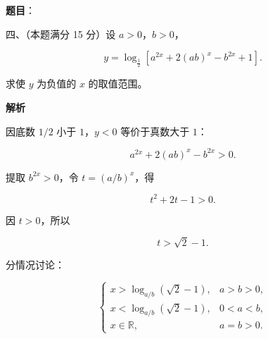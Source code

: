 \begin{answer}

\textbf{题目}：

四、（本题满分 15 分）设 $a>0$，$b>0$，

\nopagebreak[4]
\[
y=\log_{\frac12}\left[a^{2x}+2(ab)^x-b^{2x}+1\right].
\]

求使 $y$ 为负值的 $x$ 的取值范围。

\textbf{解析}

因底数 $1/2$ 小于 $1$，$y<0$ 等价于真数大于 $1$：

\nopagebreak[4]
\[
a^{2x}+2(ab)^x-b^{2x}>0.
\]

提取 $b^{2x}>0$，令 $t=(a/b)^x$，得

\nopagebreak[4]
\[
t^2+2t-1>0.
\]

因 $t>0$，所以

\nopagebreak[4]
\[
t>\sqrt2-1.
\]

分情况讨论：

\nopagebreak[4]
\[
\begin{cases}
x>\log_{a/b}(\sqrt2-1),&a>b>0,\\
x<\log_{a/b}(\sqrt2-1),&0<a<b,\\
x\in\mathbb R,&a=b>0.
\end{cases}
\]


\end{answer}

